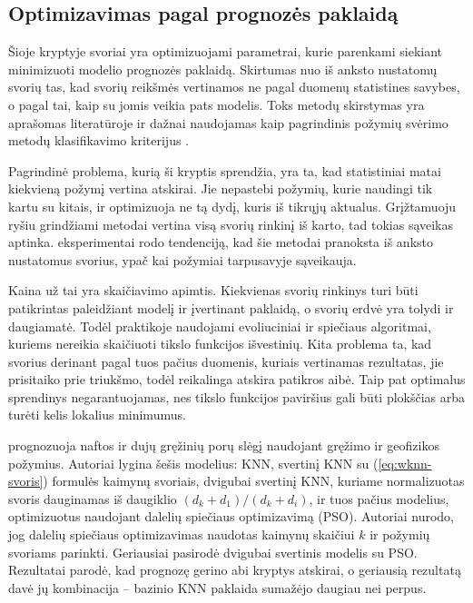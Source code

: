\documentclass[]{VUMIFTemplateClass}
\begin{document}

    \subsection{Optimizavimas pagal prognozės paklaidą}

    Šioje kryptyje svoriai yra optimizuojami parametrai, kurie parenkami siekiant minimizuoti modelio prognozės paklaidą.
    Skirtumas nuo iš anksto nustatomų svorių tas, kad svorių reikšmės vertinamos ne pagal duomenų statistines savybes, o pagal tai, kaip su jomis veikia pats modelis.
    Toks metodų skirstymas yra aprašomas literatūroje ir dažnai naudojamas kaip pagrindinis požymių svėrimo metodų klasifikavimo kriterijus \cite{wettschereck1997}.

    Pagrindinė problema, kurią ši kryptis sprendžia, yra ta, kad statistiniai matai kiekvieną požymį vertina atskirai.
    Jie nepastebi požymių, kurie naudingi tik kartu su kitais, ir optimizuoja ne tą dydį, kuris iš tikrųjų aktualus.
    Grįžtamuoju ryšiu grindžiami metodai vertina visą svorių rinkinį iš karto, tad tokias sąveikas aptinka.
    \cite{wettschereck1997} eksperimentai rodo tendenciją, kad šie metodai pranoksta iš anksto nustatomus svorius, ypač kai požymiai tarpusavyje sąveikauja.

    Kaina už tai yra skaičiavimo apimtis.
    Kiekvienas svorių rinkinys turi būti patikrintas paleidžiant modelį ir įvertinant paklaidą, o svorių erdvė yra tolydi ir daugiamatė.
    Todėl praktikoje naudojami evoliuciniai ir spiečiaus algoritmai, kuriems nereikia skaičiuoti tikslo funkcijos išvestinių.
    Kita problema ta, kad svorius derinant pagal tuos pačius duomenis, kuriais vertinamas rezultatas, jie prisitaiko prie triukšmo, todėl reikalinga atskira patikros aibė.
    Taip pat optimalus sprendinys negarantuojamas, nes tikslo funkcijos paviršius gali būti plokščias arba turėti kelis lokalius minimumus.

    \cite{jafarizadeh2022} prognozuoja naftos ir dujų gręžinių porų slėgį naudojant gręžimo ir geofizikos požymius.
    Autoriai lygina šešis modelius: KNN, svertinį KNN su (\ref{eq:wknn-svoris}) formulės kaimynų svoriais, dvigubai svertinį KNN, kuriame normalizuotas svoris dauginamas iš daugiklio $(d_k + d_1)/(d_k + d_i)$, ir tuos pačius modelius, optimizuotus naudojant dalelių spiečiaus optimizavimą (PSO).
    Autoriai nurodo, jog dalelių spiečiaus optimizavimas naudotas kaimynų skaičiui $k$ ir požymių svoriams parinkti.
    Geriausiai pasirodė dvigubai svertinis modelis su PSO.
    Rezultatai parodė, kad prognozę gerino abi kryptys atskirai, o geriausią rezultatą davė jų kombinacija -- bazinio KNN paklaida sumažėjo daugiau nei perpus.
\end{document}
